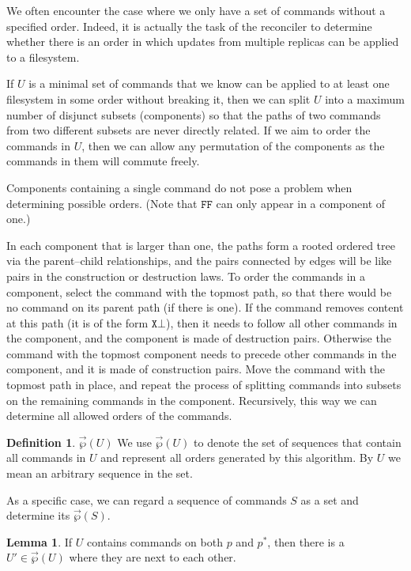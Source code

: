 \documentclass[12pt]{article}
\newcommand{\empt}{\bot}
\newcommand{\pp}{p^*} %
\newcommand{\fscommand}[2]{{#1#2}}
\newcommand{\fsregcommandchar}[1]{\mathtt{#1}}
\newcommand{\fsregcommand}[2]{\fscommand{\fsregcommandchar{#1}}{\fsregcommandchar{#2}}}
\newcommand{\cff}{\fsregcommand{F}{F}}
\newcommand{\orderset}[1]{\vec{\wp}({#1})}
\newcommand{\ordered}[1]{#1}
\theoremstyle{definition}
\newtheorem{mydef}{Definition}
\newtheorem{mylem}{Lemma}
\begin{document}
We often encounter the case where we only have a set of commands without a specified order.
Indeed, it is actually the task of the reconciler to determine whether there is an order
in which updates from multiple replicas can be applied to a filesystem.

If $U$ is a minimal set of commands
that we know can be applied to at least one filesystem in some order without breaking it,
then we can split $U$ into a maximum number of disjunct subsets
(components) so that the paths of two commands from two different subsets are never directly related.
If we aim to order the commands in $U$, then we can allow any permutation of 
the components as the commands in them will commute freely.

Components containing a single command do not pose a problem when determining
possible orders.
(Note that $\cff$ can only appear in a component of one.)

In each component that is larger than one, the paths 
form a rooted ordered tree via the parent--child relationships,
and the pairs connected by edges will be like pairs in the
construction or destruction laws.
To order the commands in a component,
select the command with the topmost path, so that there would be no command
on its parent path (if there is one). 
If the command removes content at this path (it is of the form $\fsregcommand{X}{\empt}$), then it
needs to follow all other commands in the component, and
the component is made of destruction pairs.
Otherwise the command with the topmost component needs to precede other commands
in the component, and it is made of construction pairs.
Move the command with the topmost path in place, and
repeat the process of splitting commands into subsets on the remaining commands
in the component. Recursively, this way we can determine all allowed orders of the commands.

\begin{mydef}{$\orderset{U}$}
We use $\orderset{U}$ to denote the set of sequences that contain all commands in $U$
and represent all orders generated by this algorithm.
By $\ordered{U}$ we mean an arbitrary sequence in the set.
\end{mydef}

As a specific case, we can regard a sequence of commands $S$
as a set and determine its $\orderset{S}$.

\begin{mylem}\label{lemma:neighbour}
If $U$ contains commands on both $p$ and $\pp$, then
there is a $U'\in\orderset{U}$ where they are next to each other.
\end{mylem}
\end{document}
